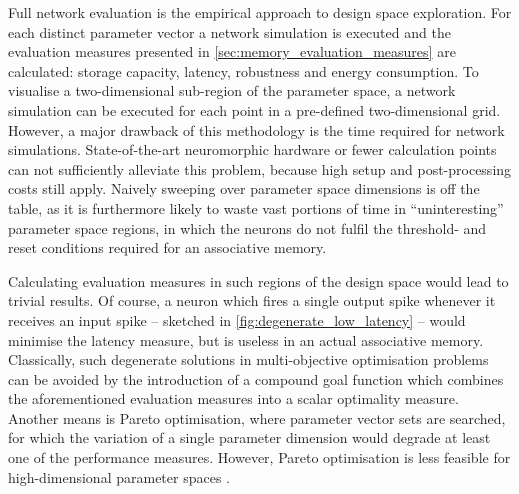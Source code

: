 Full network evaluation is the empirical approach to design space exploration. For each distinct parameter vector a network simulation is executed and the evaluation measures presented in \cref{sec:memory_evaluation_measures} are calculated: storage capacity, latency, robustness and energy consumption. To visualise a two-dimensional sub-region of the parameter space, a network simulation can be executed for each point in a pre-defined two-dimensional grid. However, a major drawback of this methodology is the time required for network simulations. State-of-the-art neuromorphic hardware or fewer calculation points can not sufficiently alleviate this problem, because high setup and post-processing costs still apply. Naively sweeping over parameter space dimensions is off the table, as it is furthermore likely to waste vast portions of time in \enquote{uninteresting} parameter space regions, in which the neurons do not fulfil the threshold- and reset conditions required for an associative memory.

{\label{fig:degenerate_low_latency}}
Calculating evaluation measures in such regions of the design space would lead to trivial results. Of course, a neuron which fires a single output spike whenever it receives an input spike -- sketched in \cref{fig:degenerate_low_latency} -- would minimise the latency measure, but is useless in an actual associative memory. Classically, such degenerate solutions in multi-objective optimisation problems can be avoided by the introduction of a compound goal function which combines the aforementioned evaluation measures into a scalar optimality measure. Another means is Pareto optimisation, where parameter vector sets are searched, for which the variation of a single parameter dimension would degrade at least one of the performance measures. However, Pareto optimisation is less feasible for high-dimensional parameter spaces \cite{miettinen2012nonlinear}.

